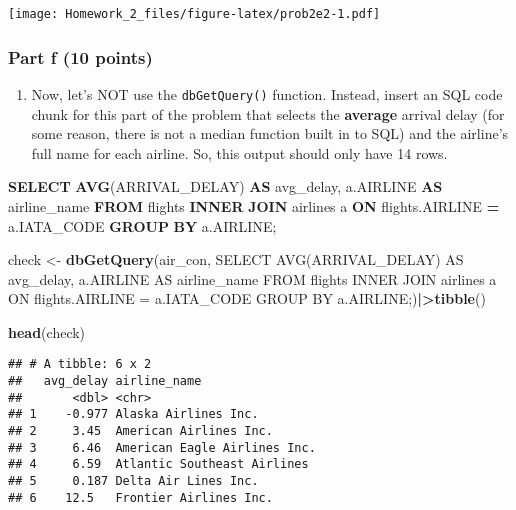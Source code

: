 \documentclass[
]{article}
\newenvironment{Shaded}{\begin{snugshade}}{\end{snugshade}}
\newcommand{\FunctionTok}[1]{\textcolor[rgb]{0.13,0.29,0.53}{\textbf{#1}}}
\newcommand{\KeywordTok}[1]{\textcolor[rgb]{0.13,0.29,0.53}{\textbf{#1}}}
\newcommand{\NormalTok}[1]{#1}
\newcommand{\OperatorTok}[1]{\textcolor[rgb]{0.81,0.36,0.00}{\textbf{#1}}}
\newcommand{\OtherTok}[1]{\textcolor[rgb]{0.56,0.35,0.01}{#1}}
\newcommand{\SpecialCharTok}[1]{\textcolor[rgb]{0.81,0.36,0.00}{\textbf{#1}}}
\newcommand{\StringTok}[1]{\textcolor[rgb]{0.31,0.60,0.02}{#1}}
\providecommand{\tightlist}{%
  \setlength{\itemsep}{0pt}\setlength{\parskip}{0pt}}
\begin{document}
\texttt{[image: Homework\_2\_files/figure-latex/prob2e2-1.pdf]}

\hypertarget{part-f-10-points}{%
\subsubsection{Part f (10 points)}\label{part-f-10-points}}

\begin{enumerate}
\def\labelenumi{\arabic{enumi}.}
\tightlist
\item
  Now, let's NOT use the \texttt{dbGetQuery()} function. Instead, insert
  an SQL code chunk for this part of the problem that selects the
  \textbf{average} arrival delay (for some reason, there is not a median
  function built in to SQL) and the airline's full name for each
  airline. So, this output should only have 14 rows.
\end{enumerate}

\begin{Shaded}
\begin{Highlighting}[]


\KeywordTok{SELECT} \FunctionTok{AVG}\NormalTok{(ARRIVAL\_DELAY) }\KeywordTok{AS}\NormalTok{ avg\_delay, a.AIRLINE }\KeywordTok{AS}\NormalTok{ airline\_name}
\KeywordTok{FROM}\NormalTok{ flights}
\KeywordTok{INNER} \KeywordTok{JOIN}\NormalTok{ airlines a }
\KeywordTok{ON}\NormalTok{ flights.AIRLINE }\OperatorTok{=}\NormalTok{ a.IATA\_CODE}
\KeywordTok{GROUP} \KeywordTok{BY}\NormalTok{ a.AIRLINE;}
\end{Highlighting}
\end{Shaded}

\begin{Shaded}
\begin{Highlighting}[]
\NormalTok{check }\OtherTok{\textless{}{-}} \FunctionTok{dbGetQuery}\NormalTok{(air\_con, }\StringTok{\textquotesingle{}SELECT AVG(ARRIVAL\_DELAY) AS avg\_delay, a.AIRLINE AS airline\_name}
\StringTok{FROM flights}
\StringTok{INNER JOIN airlines a }
\StringTok{ON flights.AIRLINE = a.IATA\_CODE}
\StringTok{GROUP BY a.AIRLINE;\textquotesingle{}}\NormalTok{)}\SpecialCharTok{|\textgreater{}}\FunctionTok{tibble}\NormalTok{()}

\FunctionTok{head}\NormalTok{(check)}
\end{Highlighting}
\end{Shaded}

\begin{verbatim}
## # A tibble: 6 x 2
##   avg_delay airline_name                
##       <dbl> <chr>                       
## 1    -0.977 Alaska Airlines Inc.        
## 2     3.45  American Airlines Inc.      
## 3     6.46  American Eagle Airlines Inc.
## 4     6.59  Atlantic Southeast Airlines 
## 5     0.187 Delta Air Lines Inc.        
## 6    12.5   Frontier Airlines Inc.
\end{verbatim}
\end{document}
